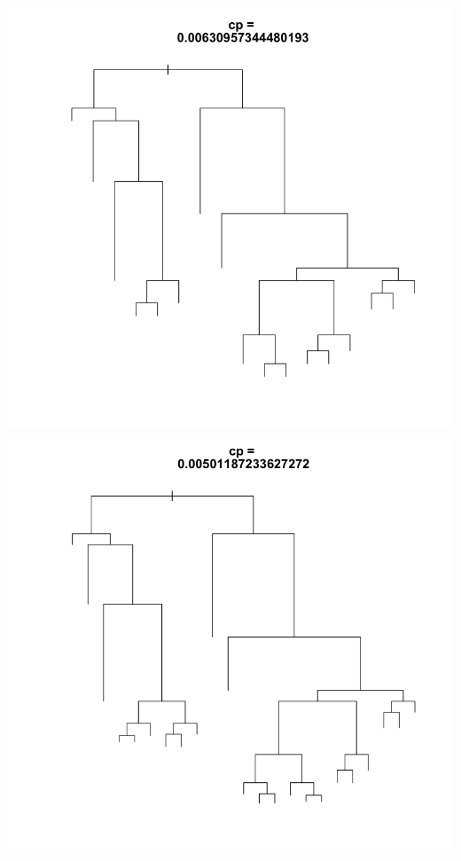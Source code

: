 \documentclass[11pt]{article}
\begin{document}
\begin{center}
\includegraphics[scale=0.25]{images/ctrl3}
\includegraphics[scale=0.25]{images/ctrl4}

\end{center}
\end{document}

